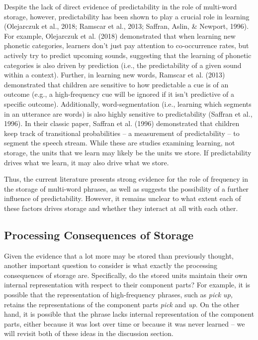 \documentclass[
  man,floatsintext]{apa6}
\begin{document}
Despite the lack of direct evidence of predictability in the role of multi-word storage, however, predictability has been shown to play a crucial role in learning (Olejarczuk et al., 2018; Ramscar et al., 2013; Saffran, Aslin, \& Newport, 1996). For example, Olejarczuk et al. (2018) demonstrated that when learning new phonetic categories, learners don't just pay attention to co-occurrence rates, but actively try to predict upcoming sounds, suggesting that the learning of phonetic categories is also driven by prediction (i.e., the predictability of a given sound within a context). Further, in learning new words, Ramscar et al. (2013) demonstrated that children are sensitive to how predictable a cue is of an outcome (e.g., a high-frequency cue will be ignored if it isn't predictive of a specific outcome). Additionally, word-segmentation (i.e., learning which segments in an utterance are words) is also highly sensitive to predictability (Saffran et al., 1996). In their classic paper, Saffran et al. (1996) demonstrated that children keep track of transitional probabilities -- a measurement of predictability -- to segment the speech stream. While these are studies examining learning, not storage, the units that we learn may likely be the units we store. If predictability drives what we learn, it may also drive what we store.

Thus, the current literature presents strong evidence for the role of frequency in the storage of multi-word phrases, as well as suggests the possibility of a further influence of predictability. However, it remains unclear to what extent each of these factors drives storage and whether they interact at all with each other.

\hypertarget{processing-consequences-of-storage}{%
\subsection{Processing Consequences of Storage}\label{processing-consequences-of-storage}}

Given the evidence that a lot more may be stored than previously thought, another important question to consider is what exactly the processing consequences of storage are. Specifically, do the stored units maintain their own internal representation with respect to their component parts? For example, it is possible that the representation of high-frequency phrases, such as \emph{pick up,} retains the representations of the component parts \emph{pick} and \emph{up}. On the other hand, it is possible that the phrase lacks internal representation of the component parts, either because it was lost over time or because it was never learned -- we will revisit both of these ideas in the discussion section.
\end{document}
